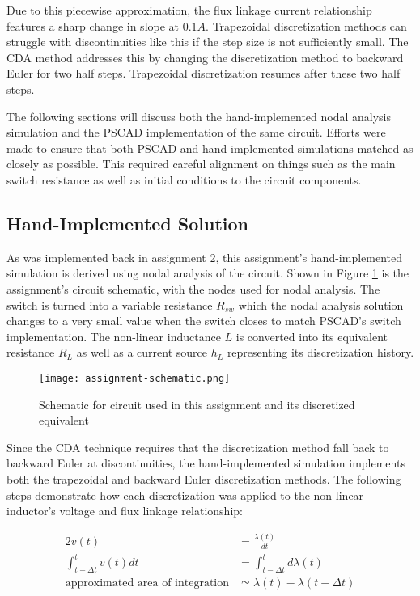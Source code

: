 \documentclass[10pt, oneside, letterpaper]{article}
\begin{document}
Due to this piecewise approximation, the flux linkage current relationship features a sharp change in slope at $0.1 A$. Trapezoidal discretization methods can struggle with discontinuities like this if the step size is not sufficiently small. The CDA method addresses this by changing the discretization method to backward Euler for two half steps. Trapezoidal discretization resumes after these two half steps.

The following sections will discuss both the hand-implemented nodal analysis simulation and the PSCAD implementation of the same circuit. Efforts were made to ensure that both PSCAD and hand-implemented simulations matched as closely as possible. This required careful alignment on things such as the main switch resistance as well as initial conditions to the circuit components.

\subsection{Hand-Implemented Solution}

As was implemented back in assignment 2, this assignment's hand-implemented simulation is derived using nodal analysis of the circuit. Shown in Figure \ref{assignment-schematic} is the assignment's circuit schematic, with the nodes used for nodal analysis. The switch is turned into a variable resistance $R_{sw}$ which the nodal analysis solution changes to a very small value when the switch closes to match PSCAD's switch implementation. The non-linear inductance $L$ is converted into its equivalent resistance $R_L$ as well as a current source $h_L$ representing its discretization history.

\begin{figure}[H]
  \centering
  \texttt{[image: assignment-schematic.png]}
  \caption{Schematic for circuit used in this assignment and its discretized equivalent}
  \label{assignment-schematic}
\end{figure}

Since the CDA technique requires that the discretization method fall back to backward Euler at discontinuities, the hand-implemented simulation implements both the trapezoidal and backward Euler discretization methods. The following steps demonstrate how each discretization was applied to the non-linear inductor's voltage and flux linkage relationship:

\begin{alignat}{2}
v(t) &= \frac{\lambda{}(t)}{dt} \\
\int_{t-\Delta{}t}^{t}v(t)dt &= \int_{t-\Delta{}t}^{t}d\lambda{}(t) \\
\text{approximated area of integration} &\simeq \lambda{}(t) - \lambda{}(t-\Delta{}t) \\
\end{alignat}
\end{document}
